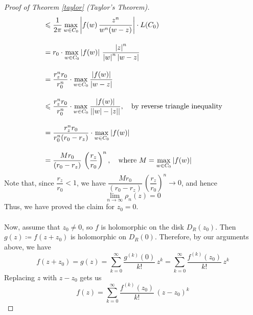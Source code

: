 \begin{proof}[Proof of Theorem \ref{taylor} (Taylor's Theorem)]
\begin{align*}
&\leqslant \frac{1}{2\pi} \max_{w \in C_0}\left\lvert f(w)\,\frac{z^n}{w^n(w - z)}\right\rvert\cdot L(C_0)\\[1em]
&= r_0\cdot\max_{w \in C_0}\left\lvert f(w)\right\rvert\,\frac{\left\lvert z\right\rvert^n}{\left\lvert w\right\rvert^n\left\lvert w - z\right\rvert}\\[1em]
&= \frac{r_z^nr_0}{r_0^n}\cdot\max_{w \in C_0}\frac{\left\lvert f(w)\right\rvert}{\left\lvert w - z\right\rvert}\\[1em]
&\leqslant \frac{r_z^nr_0}{r_0^n}\cdot\max_{w \in C_0}\frac{\left\lvert f(w)\right\rvert}{\left\lvert\left\lvert w\right\rvert - \left\lvert z\right\rvert\right\rvert},\quad \text{by reverse triangle inequality}\\[1em]
&= \frac{r_z^nr_0}{r_0^n(r_0 - r_z)}\cdot\max_{w \in C_0}\left\lvert f(w)\right\rvert\\[1em]
&= \frac{Mr_0}{(r_0 - r_z)}\,\left(\frac{r_z}{r_0}\right)^n,\quad \text{where $M = \max_{w \in C_0}\left\lvert f(w)\right\rvert$}
\end{align*}
Note that, since $\dfrac{r_z}{r_0} < 1$, we have $\dfrac{Mr_0}{(r_0 - r_z)}\,\left(\dfrac{r_z}{r_0}\right)^n \to 0$, and hence
\[\lim_{n \to \infty}\rho_n(z) = 0\]
Thus, we have proved the claim for $z_0 = 0$.\\
\\
Now, assume that $z_0 \neq 0$, so $f$ is holomorphic on the disk $D_R(z_0)$. Then $g(z) \coloneqq f(z + z_0)$ is holomorphic on $D_R(0)$. Therefore, by our arguments above, we have
\[f(z + z_0) = g(z) = \sum_{k = 0}^\infty\frac{g^{(k)}(0)}{k!}\,z^k = \sum_{k = 0}^\infty\frac{f^{(k)}(z_0)}{k!}\,z^k\]
Replacing $z$ with $z - z_0$ gets us
\[f(z) = \sum_{k = 0}^\infty\frac{f^{(k)}(z_0)}{k!}\,(z - z_0)^k\]
\end{proof}

\vspace*{1em}

